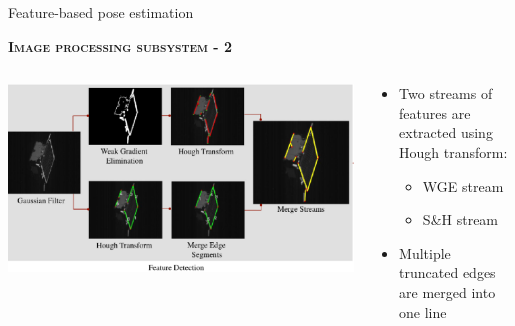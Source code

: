 \documentclass[10pt]{beamer}
\begin{document}
\begin{frame}{Feature-based pose estimation}

  \bigskip

  \textsc{\textbf{\large Image processing subsystem - 2}}

  \smallskip

  \begin{columns}[T,onlytextwidth]
    \hspace{-0.2cm}
    \begin{column}{0.5\textwidth}
      \includegraphics[height=0.4\textheight]{gfx/imageProcessingSubsystem2.eps}
    \end{column}
    \hspace{1cm}
    \begin{column}{0.43\textwidth}
      \vspace{0.3cm}
      {\small\begin{itemize}[label=$\rightarrow$]
          \item Two streams of features are extracted using Hough transform:
                {\footnotesize\begin{itemize}[topsep=0pt,label=-]
                  \item WGE stream
                  \item S\&H stream
                \end{itemize}}
          \item Multiple truncated edges are merged into one line
        \end{itemize}}
    \end{column}
  \end{columns}


\end{frame}
\end{document}
